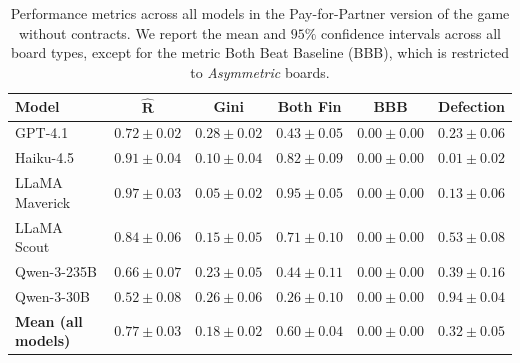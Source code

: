 \documentclass{article} %
\newcommand{\GPT}{GPT-4.1\xspace}
\newcommand{\Haiku}{Haiku-4.5\xspace}
\newcommand{\Maverick}{LLaMA Maverick\xspace}
\newcommand{\Scout}{LLaMA Scout\xspace}
\newcommand{\Qthirty}{Qwen-3-30B\xspace}
\newcommand{\PforP}{Pay-for-Partner\xspace}
\begin{document}
\begin{table}[b]
\centering
\begin{small}
\begin{tabular}{lccccc}
\toprule
\textbf{Model}
& \textbf{$\mathbf{\hat{R}}$}
& \textbf{Gini}
& \textbf{Both Fin}
& \textbf{BBB}
& \textbf{Defection}
\\
\midrule
%
\GPT
& $0.72 \pm 0.02$
& $0.28 \pm 0.02$
& $0.43 \pm 0.05$
& $0.00 \pm 0.00$
& $0.23 \pm 0.06$
\\

\Haiku
& $0.91 \pm 0.04$
& $0.10 \pm 0.04$
& $0.82 \pm 0.09$
& $0.00 \pm 0.00$
& $0.01 \pm 0.02$
\\

\Maverick
& $0.97 \pm 0.03$
& $0.05 \pm 0.02$
& $0.95 \pm 0.05$
& $0.00 \pm 0.00$
& $0.13 \pm 0.06$
\\

\Scout
& $0.84 \pm 0.06$
& $0.15 \pm 0.05$
& $0.71 \pm 0.10$
& $0.00 \pm 0.00$
& $0.53 \pm 0.08$
\\

Qwen-3-235B
& $0.66 \pm 0.07$
& $0.23 \pm 0.05$
& $0.44 \pm 0.11$
& $0.00 \pm 0.00$
& $0.39 \pm 0.16$
\\

\Qthirty
& $0.52 \pm 0.08$
& $0.26 \pm 0.06$
& $0.26 \pm 0.10$
& $0.00 \pm 0.00$
& $0.94 \pm 0.04$
\\

\midrule
%
\textbf{Mean (all models)}
& $\mathbf{0.77 \pm 0.03}$
& $\mathbf{0.18 \pm 0.02}$
& $\mathbf{0.60 \pm 0.04}$
& $\mathbf{0.00 \pm 0.00}$
& $\mathbf{0.32 \pm 0.05}$
\\
\bottomrule
\end{tabular}
\end{small}
\caption{Performance metrics across all models in the \PforP version of the game without contracts. We report the mean and $95\%$ confidence intervals  across all board types, except for the metric Both Beat Baseline (BBB), which is restricted to \textit{Asymmetric} boards.\protect\footnotemark}
\label{tab:model_performance_metrics_p4p}
\end{table}

\end{document}
